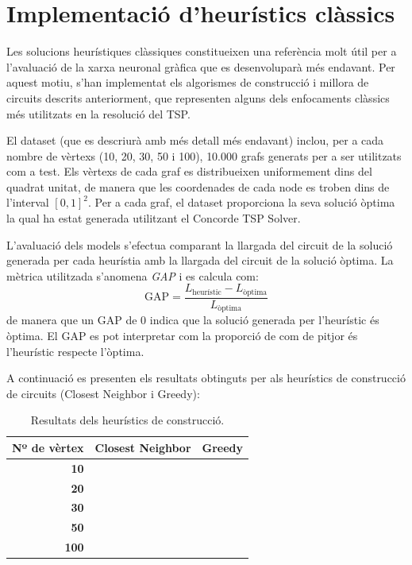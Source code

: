 \documentclass[a4paper,12pt,twoside]{ThesisStyle}
\begin{document}
\section{Implementació d'heurístics clàssics}
\label{ImplementacioHeuristicsClassiques}
Les solucions heurístiques clàssiques constitueixen una referència molt útil per a l’avaluació de la xarxa neuronal gràfica que es desenvoluparà més endavant. Per aquest motiu, s’han implementat els algorismes de construcció i millora de circuits descrits anteriorment, que representen alguns dels enfocaments clàssics més utilitzats en la resolució del TSP.

\medskip

El dataset (que es descriurà amb més detall més endavant) inclou, per a cada nombre de vèrtexs (10, 20, 30, 50 i 100), 10.000 grafs generats per a ser utilitzats com a test. Els vèrtexs de cada graf es distribueixen uniformement dins del quadrat unitat, de manera que les coordenades de cada node es troben dins de l’interval $[0,1]^2$. Per a cada graf, el dataset proporciona la seva solució òptima la qual ha estat generada utilitzant el Concorde TSP Solver\cite{ConcordeTSP}.

\medskip

L'avaluació dels models s'efectua comparant la llargada del circuit de la solució generada per cada heurístia amb la llargada del circuit de la solució òptima. La mètrica utilitzada s'anomena \textit{GAP} i es calcula com:
\begin{equation}
  \text{GAP} = \frac{L_{\text{heurístic}} - L_{\text{òptima}}}{L_{\text{òptima}}}
  \label{equ:GAP}
\end{equation}
de manera que un GAP de 0 indica que la solució generada per l'heurístic és òptima. El GAP es pot interpretar com la proporció de com de pitjor és l'heurístic respecte l'òptima.

\medskip

A continuació es presenten els resultats obtinguts per als heurístics de construcció de circuits (Closest Neighbor i Greedy):

\begin{table}[htb]
  \centering
  \begin{tabular}{ | r | c | c | }
   \hline
   \textbf{Nº de vèrtex} & \textbf{Closest Neighbor} & \textbf{Greedy} \\
   \hline
   \textbf{10}  &  &  \\
   \textbf{20}  &  &  \\
   \textbf{30}  &  &  \\
   \textbf{50}  &  &  \\
   \textbf{100} &  &  \\
   \hline
  \end{tabular}
  \caption{Resultats dels heurístics de construcció.}
  \label{taula:heuristicsConstruccio}
\end{table}
\end{document}
